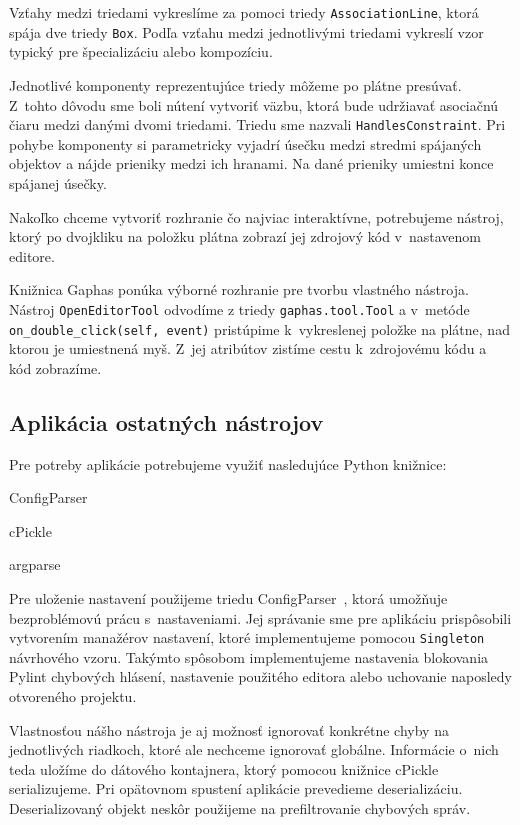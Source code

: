 \documentclass[11pt,oneside,final]{fithesis2}
\begin{document}
		Vzťahy medzi triedami vykreslíme za pomoci triedy \texttt{AssociationLine}, ktorá spája dve triedy \texttt{Box}. Podľa vzťahu medzi jednotlivými triedami vykreslí vzor typický pre špecializáciu alebo kompozíciu.
		
		Jednotlivé komponenty reprezentujúce triedy môžeme po plátne presúvať. Z~tohto dôvodu sme boli nútení vytvoriť väzbu, ktorá bude udržiavať asociačnú čiaru medzi danými dvomi triedami. Triedu sme nazvali \texttt{HandlesConstraint}. Pri pohybe komponenty si parametricky vyjadrí úsečku medzi stredmi spájaných objektov a nájde prieniky medzi ich hranami. Na dané prieniky umiestni konce spájanej úsečky.
		
		Nakoľko chceme vytvoriť rozhranie čo najviac interaktívne, potrebujeme nástroj, ktorý po dvojkliku na položku plátna zobrazí jej zdrojový kód v~nastavenom editore.
		
		Knižnica Gaphas ponúka výborné rozhranie pre tvorbu vlastného nástroja. Nástroj \texttt{OpenEditorTool} odvodíme z triedy \texttt{gaphas.tool.Tool} a v~metóde \texttt{on\_double\_click(self, event)} pristúpime k~vykreslenej položke na plátne, nad ktorou je umiestnená myš. Z~jej atribútov zistíme cestu k~zdrojovému kódu a kód zobrazíme.

		\subsection{Aplikácia ostatných nástrojov}
			
	Pre potreby aplikácie potrebujeme využiť nasledujúce Python knižnice:
	
				\begin{list}{•}{}
					\item ConfigParser
					\item cPickle
					\item argparse
    			\end{list}
	
	 Pre uloženie nastavení použijeme triedu ConfigParser~\cite{configparser}, ktorá umožňuje bezproblémovú prácu s~nastaveniami. Jej správanie sme pre aplikáciu prispôsobili vytvorením manažérov nastavení, ktoré implementujeme pomocou \texttt{Singleton}~\cite{singleton} návrhového vzoru. Takýmto spôsobom implementujeme nastavenia blokovania Pylint chybových hlásení, nastavenie použitého editora alebo uchovanie naposledy otvoreného projektu.
	
	Vlastnosťou nášho nástroja je aj možnosť ignorovať konkrétne chyby na jednotlivých riadkoch, ktoré ale nechceme ignorovať globálne. Informácie o~nich teda uložíme do dátového kontajnera, ktorý pomocou knižnice cPickle~\cite{cpickle} serializujeme. Pri opätovnom spustení aplikácie prevedieme deserializáciu. Deserializovaný objekt neskôr použijeme na prefiltrovanie chybových správ.
	
\end{document}
